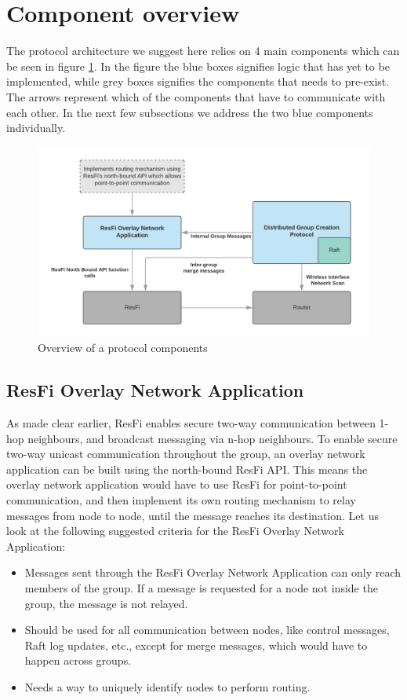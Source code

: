 \section{Component overview}
The protocol architecture we suggest here relies on 4 main components which can be seen in figure \ref{fig:dgcpoverview}.
In the figure the blue boxes signifies logic that has yet to be implemented, while grey boxes signifies the components that needs to pre-exist. The arrows
represent which of the components that have to communicate with each other. In the next few subsections we address the two blue components individually.

\begin{figure}
	\includegraphics[width=\textwidth]{Images/dgcpoverview.png}
		\caption{Overview of a protocol components }%
		\label{fig:dgcpoverview}%
\end{figure}


\subsection{ResFi Overlay Network Application}
As made clear earlier, ResFi enables secure two-way communication between 1-hop neighbours, and broadcast messaging via n-hop neighbours. 
To enable secure two-way unicast communication throughout the group, an overlay network application can be built using the north-bound ResFi API. 
This means the overlay network application would have to use ResFi for point-to-point communication, and then implement its own routing mechanism
to relay messages from node to node, until the message reaches its destination. Let us look at the following suggested criteria for the ResFi Overlay Network Application:

\begin{itemize}
	\item Messages sent through the ResFi Overlay Network Application can only reach members of the group. If a message is requested for a node not inside the group,
		the message is not relayed.
  \item Should be used for all communication between nodes, like control messages, Raft log updates, etc., except for merge messages, which would have to happen across
		groups. 
	\item Needs a way to uniquely identify nodes to perform routing.
\end{itemize}


